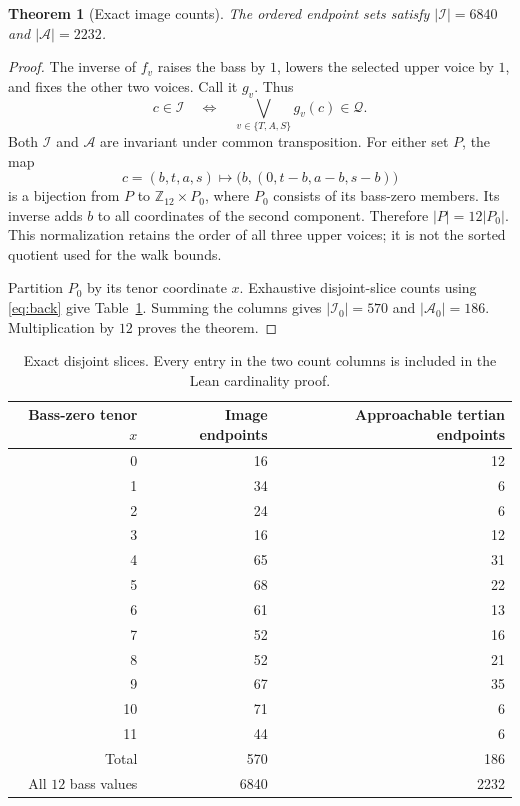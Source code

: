 \documentclass[11pt,letterpaper]{article}
\newtheorem{theorem}{Theorem}
\theoremstyle{definition}\newtheorem{definition}[theorem]{Definition}
\newcommand{\Z}{\mathbb Z}
\newcommand{\Q}{\mathcal Q}
\newcommand{\I}{\mathcal I}
\newcommand{\Aset}{\mathcal A}
\newcommand{\card}[1]{\lvert #1\rvert}
\begin{document}
\begin{theorem}[Exact image counts]\label{thm:counts}
The ordered endpoint sets satisfy $\card{\I}=6840$ and $\card{\Aset}=2232$.
\end{theorem}
\begin{proof}
The inverse of $f_v$ raises the bass by $1$, lowers the selected upper voice by $1$, and fixes the other two voices. Call it $g_v$. Thus
\begin{equation}\label{eq:back}
 c\in\I\quad\Longleftrightarrow\quad
 \bigvee_{v\in\{T,A,S\}}g_v(c)\in\Q.
\end{equation}
Both $\I$ and $\Aset$ are invariant under common transposition. For either set $P$, the map
\[
 c=(b,t,a,s)\longmapsto
 \bigl(b,(0,t-b,a-b,s-b)\bigr)
\]
is a bijection from $P$ to $\Z_{12}\times P_0$, where $P_0$ consists of its bass-zero members. Its inverse adds $b$ to all coordinates of the second component. Therefore $\card{P}=12\card{P_0}$. This normalization retains the order of all three upper voices; it is not the sorted quotient used for the walk bounds.

Partition $P_0$ by its tenor coordinate $x$. Exhaustive disjoint-slice counts using \eqref{eq:back} give Table~\ref{tab:counts}. Summing the columns gives $\card{\I_0}=570$ and $\card{\Aset_0}=186$. Multiplication by $12$ proves the theorem.
\end{proof}

\begin{table}[h!]
\centering
\renewcommand{\arraystretch}{0.97}
\begin{tabular}{r rr}\toprule
Bass-zero tenor $x$ & Image endpoints & Approachable tertian endpoints\\\midrule
0&16&12\\1&34&6\\2&24&6\\3&16&12\\4&65&31\\5&68&22\\
6&61&13\\7&52&16\\8&52&21\\9&67&35\\10&71&6\\11&44&6\\\midrule
Total&570&186\\
All $12$ bass values&6840&2232\\\bottomrule
\end{tabular}
\caption{Exact disjoint slices. Every entry in the two count columns is included in the Lean cardinality proof.}\label{tab:counts}
\end{table}
\end{document}
